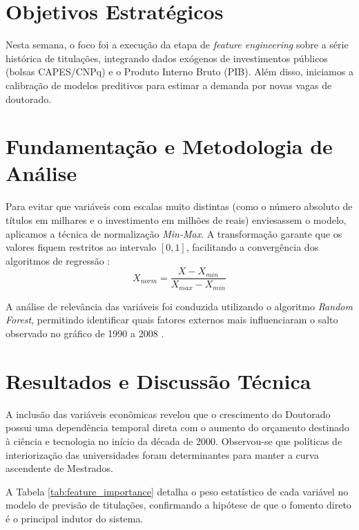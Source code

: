 
\section{Objetivos Estratégicos}
Nesta semana, o foco foi a execução da etapa de \textit{feature engineering} sobre a série histórica de titulações, integrando dados exógenos de investimentos públicos (bolsas CAPES/CNPq) e o Produto Interno Bruto (PIB). Além disso, iniciamos a calibração de modelos preditivos para estimar a demanda por novas vagas de doutorado.

\section{Fundamentação e Metodologia de Análise}
Para evitar que variáveis com escalas muito distintas (como o número absoluto de títulos em milhares e o investimento em milhões de reais) enviesassem o modelo, aplicamos a técnica de normalização \textit{Min-Max}. A transformação garante que os valores fiquem restritos ao intervalo $[0, 1]$, facilitando a convergência dos algoritmos de regressão \cite{Ferreira2019}:
$$X_{norm} = \frac{X - X_{min}}{X_{max} - X_{min}}$$

A análise de relevância das variáveis foi conduzida utilizando o algoritmo \textit{Random Forest}, permitindo identificar quais fatores externos mais influenciaram o salto observado no gráfico de 1990 a 2008 \cite{Silva2023}.

\section{Resultados e Discussão Técnica}
A inclusão das variáveis econômicas revelou que o crescimento do Doutorado possui uma dependência temporal direta com o aumento do orçamento destinado à ciência e tecnologia no início da década de 2000. Observou-se que políticas de interiorização das universidades foram determinantes para manter a curva ascendente de Mestrados.

A Tabela \ref{tab:feature_importance} detalha o peso estatístico de cada variável no modelo de previsão de titulações, confirmando a hipótese de que o fomento direto é o principal indutor do sistema.

